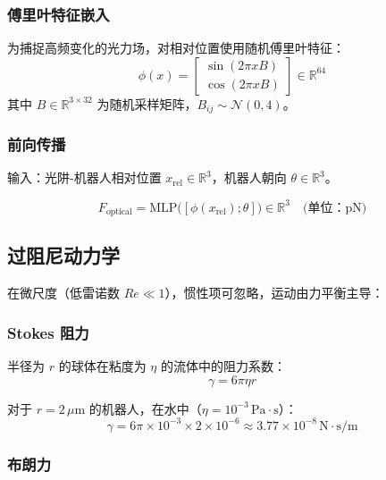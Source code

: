 \documentclass[UTF8, a4paper]{ctexart}
\begin{document}
\subsubsection{傅里叶特征嵌入}

为捕捉高频变化的光力场，对相对位置使用随机傅里叶特征：
\begin{equation}
\phi(x) = \begin{bmatrix} \sin(2\pi x B) \\ \cos(2\pi x B) \end{bmatrix} \in \mathbb{R}^{64}
\end{equation}
其中 $B \in \mathbb{R}^{3 \times 32}$ 为随机采样矩阵，$B_{ij} \sim \mathcal{N}(0, 4)$。

\subsubsection{前向传播}

输入：光阱-机器人相对位置 $x_{\text{rel}} \in \mathbb{R}^3$，机器人朝向 $\theta \in \mathbb{R}^3$。

\begin{equation}
F_{\text{optical}} = \text{MLP}\big([\phi(x_{\text{rel}}); \theta]\big) \in \mathbb{R}^3 \quad \text{(单位：pN)}
\end{equation}

\subsection{过阻尼动力学}

在微尺度（低雷诺数 $Re \ll 1$），惯性项可忽略，运动由力平衡主导：

\subsubsection{Stokes 阻力}

半径为 $r$ 的球体在粘度为 $\eta$ 的流体中的阻力系数：
\begin{equation}
\boxed{\gamma = 6\pi\eta r}
\end{equation}

对于 $r = 2\,\mu\text{m}$ 的机器人，在水中（$\eta = 10^{-3}\,\text{Pa}\cdot\text{s}$）：
\begin{equation}
\gamma = 6\pi \times 10^{-3} \times 2\times 10^{-6} \approx 3.77 \times 10^{-8}\,\text{N}\cdot\text{s}/\text{m}
\end{equation}

\subsubsection{布朗力}
\end{document}
